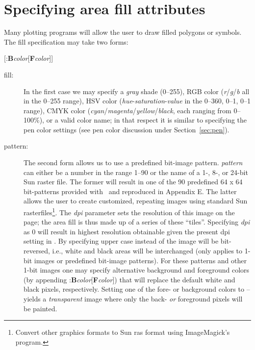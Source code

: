 \section{Specifying area fill attributes}

%
%
%
%
%
%
%
\label{sec:fill}

Many plotting programs will allow the user to draw filled polygons or
symbols.  The fill specification may take two forms: 

\vspace{\baselineskip} 

\par {}\par 

\par {}[:{\bf B}{\it color}[{\bf F}{\it color}]]\par 

\vspace{\baselineskip} 
\noindent
\begin{description}
\item [fill:]
In the first case we may specify a {\it gray} shade (0--255), RGB color
({\it r}/{\it g}/{\it b} all in the 0--255 range), HSV color ({\it hue}-{\it saturation}-{\it value}
in the 0--360, 0--1, 0--1 range), CMYK color ({\it cyan}/{\it magenta}/{\it yellow}/{\it black},
each ranging from 0--100\%), or a valid color name; in that respect it is similar
to specifying the pen color settings (see pen color discussion under Section~\ref{sec:pen}).
\item [pattern:]
The second form allows us to use a predefined bit-image pattern.
{\it pattern} can either be a number in the range 1--90 or the name of a 1-,
8-, or 24-bit Sun raster file.  The former will result in one of the 90
predefined 64 x 64 bit-patterns provided with \GMT\ and reproduced in Appendix E.
The latter allows the user to create customized, repeating images using
standard Sun rasterfiles\footnote{Convert other graphics formats to Sun ras format using
ImageMagick's  program.}.  The {\it dpi} parameter sets the resolution of
this image on the page;  the area fill is thus made up of a series of these
``tiles''.  Specifying {\it dpi} as 0 will result in highest resolution
obtainable given the present dpi setting in .
By specifying upper case  instead of  the image will be
bit-reversed, i.e., white and black areas will be interchanged (only applies
to 1-bit images or predefined bit-image patterns).  For these patterns and
other 1-bit images one may specify alternative background and foreground
colors (by appending :{\bf B}{\it color}[{\bf F}{\it color}]) that will
replace the default white and black pixels, respectively.  Setting one of the
fore- or background colors to -- yields a \emph{transparent} image where only the
back- \emph{or} foreground pixels will be painted.
\end{description}

